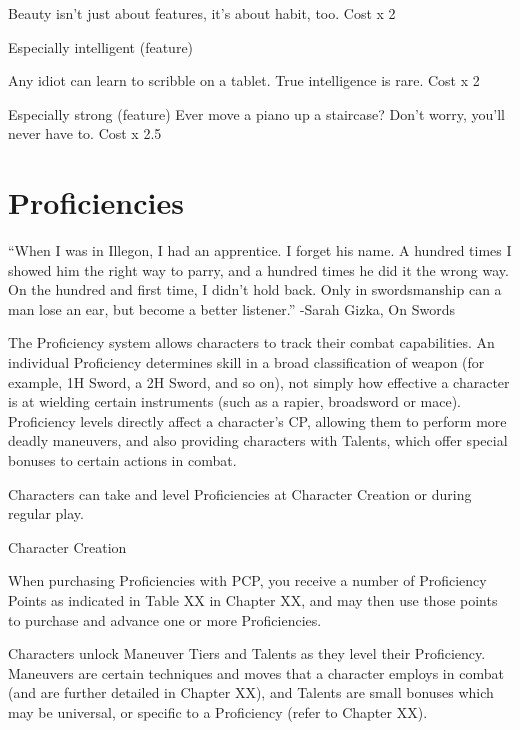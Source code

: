 \documentclass[oneside,11pt,english]{book}
\begin{document}
Beauty isn’t just about features, it’s about habit, too. Cost x 2 

Especially intelligent 
(feature) 

Any idiot can learn to scribble on a tablet. True intelligence is rare. Cost x 2 

Especially strong (feature) Ever move a piano up a staircase? Don’t worry, you’ll never have to. Cost x 
2.5 

 

 

\chapter{Proficiencies}\label{ch:proficiencies}
\clearpage
 

“When I was in Illegon, I had an apprentice. I forget his name. A hundred times I showed him the right way to parry, and a 
hundred times he did it the wrong way. On the hundred and first time, I didn’t hold back. Only in swordsmanship can a man lose 
an ear, but become a better listener.” 
-Sarah Gizka, On Swords 
 

 

The Proficiency system allows characters to track their combat capabilities. An individual Proficiency 
determines skill in a broad classification of weapon (for example, 1H Sword, a 2H Sword, and so on), not 
simply how effective a character is at wielding certain instruments (such as a rapier, broadsword or 
mace). Proficiency levels directly affect a character’s CP, allowing them to perform more deadly 
maneuvers, and also providing characters with Talents, which offer special bonuses to certain actions in 
combat. 


 

Characters can take and level Proficiencies at Character Creation or during regular play. 

 

Character Creation 

 

When purchasing Proficiencies with PCP, you receive a number of Proficiency Points as indicated in 
Table XX in Chapter XX, and may then use those points to purchase and advance one or more 
Proficiencies. 

 

Characters unlock Maneuver Tiers and Talents as they level their Proficiency. Maneuvers are certain 
techniques and moves that a character employs in combat (and are further detailed in Chapter XX), and 
Talents are small bonuses which may be universal, or specific to a Proficiency (refer to Chapter XX). 
\end{document}
